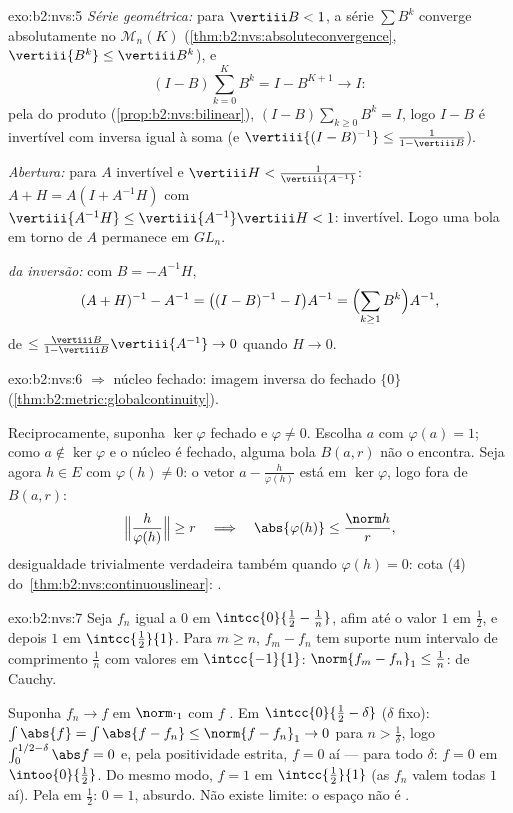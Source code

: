 \begin{solution}{exo:b2:nvs:5}
\emph{Série geométrica:} para $\vertiii B < 1$, a série $\sum
B^k$ converge absolutamente no  $\mathcal{M}_n(K)$
(\cref{thm:b2:nvs:absoluteconvergence}, $\vertiii{B^k} \leq
\vertiii B^k$), e
\[
(I - B)\sum_{k=0}^{K} B^k = I - B^{K+1} \longrightarrow I :
\]
pela  do produto
(\cref{prop:b2:nvs:bilinear}), $(I - B)\sum_{k\geq0} B^k = I$, logo
$I - B$ é invertível com inversa igual à soma (e
$\vertiii{(I-B)^{-1}} \leq \frac{1}{1 - \vertiii B}$).

\emph{Abertura:} para $A$ invertível e $\vertiii H <
\frac{1}{\vertiii{A^{-1}}}$: $A + H = A(I + A^{-1}H)$ com
$\vertiii{A^{-1}H} \leq \vertiii{A^{-1}}\vertiii H < 1$: invertível.
Logo uma bola em torno de $A$ permanece em $GL_n$.

\emph{ da inversão:} com $B = -A^{-1}H$,
\[
(A + H)^{-1} - A^{-1} = \bigl((I - B)^{-1} - I\bigr)A^{-1}
= \Bigl(\sum_{k \geq 1} B^k\Bigr) A^{-1},
\]
de  $\leq \frac{\vertiii B}{1 - \vertiii B}\vertiii{A^{-1}}
\to 0$ quando $H \to 0$.
\end{solution}

\begin{solution}{exo:b2:nvs:6}
 $\Rightarrow$ núcleo fechado: imagem inversa do fechado
$\{0\}$ (\cref{thm:b2:metric:globalcontinuity}).

Reciprocamente, suponha $\ker\varphi$ fechado e $\varphi \neq 0$. Escolha
$a$ com $\varphi(a) = 1$; como $a \notin \ker\varphi$ e o
núcleo é fechado, alguma bola $B(a, r)$ não o encontra. Seja agora $h \in E$
com $\varphi(h) \neq 0$: o vetor $a - \frac{h}{\varphi(h)}$
está em $\ker\varphi$, logo fora de $B(a, r)$:
\[
\Bigl\Vert \frac{h}{\varphi(h)} \Bigr\Vert \geq r
\quad\Longrightarrow\quad
\abs{\varphi(h)} \leq \frac{\norm h}{r},
\]
desigualdade trivialmente verdadeira também quando $\varphi(h) = 0$: cota
(4) do~\cref{thm:b2:nvs:continuouslinear}: .
\end{solution}

\begin{solution}{exo:b2:nvs:7}
Seja $f_n$ igual a $0$ em $\intcc{0}{\frac12 - \frac1n}$, afim até o
valor $1$ em $\frac12$, e depois $1$ em $\intcc{\frac12}{1}$. Para $m
\geq n$, $f_m - f_n$ tem suporte num intervalo de comprimento
$\frac1n$ com valores em $\intcc{-1}{1}$: $\norm{f_m - f_n}_1 \leq
\frac1n$: de Cauchy.

Suponha $f_n \to f$ em $\norm\cdot_1$ com $f$ . Em
$\intcc{0}{\frac12 - \delta}$ ($\delta$ fixo): $\int \abs{f} =
\int\abs{f - f_n} \leq \norm{f - f_n}_1 \to 0$ para $n >
\frac1\delta$, logo $\int_0^{1/2 - \delta}\abs f = 0$ e, pela positividade
estrita, $f = 0$ aí --- para todo $\delta$: $f = 0$ em
$\intoo{0}{\frac12}$. Do mesmo modo, $f = 1$ em $\intcc{\frac12}{1}$
(as $f_n$ valem todas $1$ aí). Pela  em $\frac12$: $0 =
1$, absurdo. Não existe limite: o espaço não é .
\end{solution}

